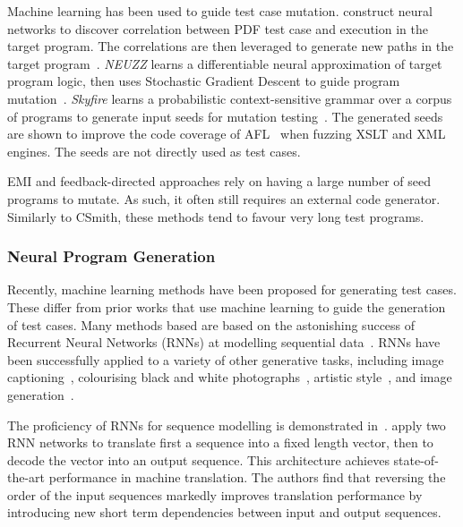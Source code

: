 Machine learning has been used to guide test case mutation.
\citeauthor{Cheng2019} construct neural networks to discover correlation between PDF test case and execution in the target program. The correlations are then leveraged to generate new paths in the target program~\cite{Cheng2019}.
\emph{NEUZZ} learns a differentiable neural approximation of target program logic, then uses Stochastic Gradient Descent to guide program mutation~\cite{She2018}.
\emph{Skyfire} learns a probabilistic context-sensitive grammar over a corpus of programs to generate input seeds for mutation testing~\cite{Wang2017c}. The generated seeds are shown to improve the code coverage of AFL~\cite{Zalewski} when fuzzing XSLT and XML engines. The seeds are not directly used as test cases.

EMI and feedback-directed approaches rely on having a large number of seed programs to mutate. As such, it often still requires an external code generator. Similarly to CSmith, these methods tend to favour very long test programs.


\subsubsection{Neural Program Generation}
\label{subsec:related-work-neural-program-generation}

Recently, machine learning methods have been proposed for generating test cases. These differ from prior works that use machine learning to guide the generation of test cases.
Many methods based are based on the astonishing success of Recurrent Neural Networks (RNNs) at modelling sequential data~\cite{Jozefowicz2016a}. RNNs have been successfully applied to a variety of other generative tasks, including image captioning~\cite{Vinyals}, colourising black and white photographs~\cite{Zhang2016}, artistic style~\cite{Gatys2015}, and image generation~\cite{Gregor2014}.

The proficiency of RNNs for sequence modelling is demonstrated in~\cite{Sutskever2014}. \citeauthor{Sutskever2014} apply two RNN networks to translate first a sequence into a fixed length vector, then to decode the vector into an output sequence. This architecture achieves state-of-the-art performance in machine translation. The authors find that reversing the order of the input sequences markedly improves translation performance by introducing new short term dependencies between input and output sequences.

